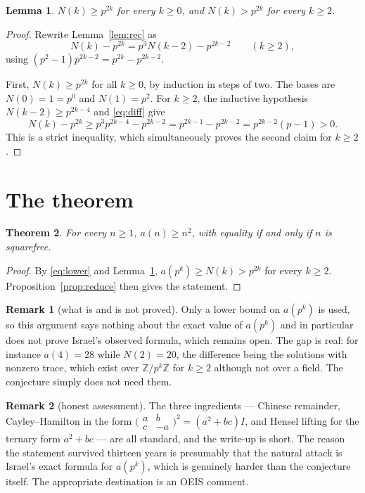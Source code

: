 \documentclass[11pt,a4paper]{article}
\theoremstyle{plain}
\newtheorem{theorem}{Theorem}
\newtheorem{lemma}[theorem]{Lemma}
\theoremstyle{definition}
\newtheorem*{remark}{Remark}
\begin{document}
\begin{lemma}\label{lem:bound}
$N(k)\ge p^{2k}$ for every $k\ge0$, and $N(k)>p^{2k}$ for every $k\ge2$.
\end{lemma}

\begin{proof}
Rewrite Lemma~\ref{lem:rec} as
\begin{equation}\label{eq:diff}
  N(k)-p^{2k}=p^{3}N(k-2)-p^{2k-2}\qquad(k\ge2),
\end{equation}
using $(p^{2}-1)p^{2k-2}=p^{2k}-p^{2k-2}$.

First, $N(k)\ge p^{2k}$ for all $k\ge0$, by induction in steps of two. The bases are
$N(0)=1=p^{0}$ and $N(1)=p^{2}$. For $k\ge2$, the inductive hypothesis $N(k-2)\ge p^{2k-4}$
and \eqref{eq:diff} give
\[
  N(k)-p^{2k}\ge p^{3}p^{2k-4}-p^{2k-2}=p^{2k-1}-p^{2k-2}=p^{2k-2}(p-1)>0.
\]
This is a strict inequality, which simultaneously proves the second claim for $k\ge2$.
\end{proof}

\section{The theorem}

\begin{theorem}\label{thm:main}
For every $n\ge1$, $a(n)\ge n^{2}$, with equality if and only if $n$ is squarefree.
\end{theorem}

\begin{proof}
By \eqref{eq:lower} and Lemma~\ref{lem:bound}, $a(p^{k})\ge N(k)>p^{2k}$ for every $k\ge2$.
Proposition~\ref{prop:reduce} then gives the statement.
\end{proof}

\begin{remark}[what is and is not proved]
Only a lower bound on $a(p^{k})$ is used, so this argument says nothing about the exact
value of $a(p^{k})$ and in particular does not prove Israel's observed formula, which
remains open. The gap is real: for instance $a(4)=28$ while $N(2)=20$, the difference being
the solutions with nonzero trace, which exist over $\mathbb{Z}/p^{k}\mathbb{Z}$ for $k\ge2$
although not over a field. The conjecture simply does not need them.
\end{remark}

\begin{remark}[honest assessment]
The three ingredients --- Chinese remainder, Cayley--Hamilton in the form
$\bigl(\begin{smallmatrix}a&b\\c&-a\end{smallmatrix}\bigr)^{2}=(a^{2}+bc)I$, and Hensel
lifting for the ternary form $a^{2}+bc$ --- are all standard, and the write-up is short.
The reason the statement survived thirteen years is presumably that the natural attack is
Israel's exact formula for $a(p^{k})$, which is genuinely harder than the conjecture
itself. The appropriate destination is an OEIS comment.
\end{remark}
\end{document}
